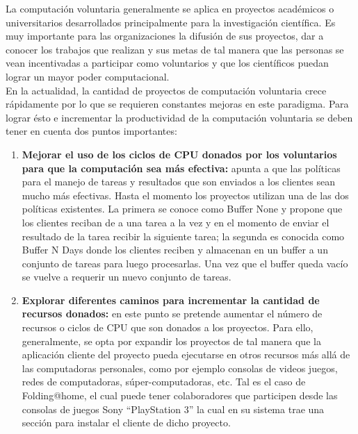 La computación voluntaria generalmente se aplica en proyectos académicos o universitarios desarrollados principalmente para la investigación científica. 
Es muy importante para las organizaciones la difusión de sus proyectos, dar a conocer los trabajos que realizan y sus metas de tal manera que las personas se vean incentivadas a participar  como voluntarios y que los científicos puedan lograr un mayor poder computacional.\\

En la actualidad, la cantidad de proyectos de computación voluntaria crece rápidamente por lo que se requieren constantes mejoras en este paradigma.
Para lograr ésto e incrementar la productividad de la computación voluntaria se deben tener en cuenta dos puntos importantes:\\

\begin{enumerate}
 \item \textbf{Mejorar el uso de los ciclos de CPU donados por los voluntarios para que la computación sea más efectiva:}
  apunta a que las políticas para el manejo de tareas y resultados que son enviados a los clientes sean mucho más efectivas.
  Hasta el momento los proyectos utilizan una de las dos políticas existentes.
  La primera se conoce como Buffer None y propone que los clientes reciban de a una tarea a la vez y en el momento de enviar el resultado de la tarea recibir la siguiente tarea; 
  la segunda es conocida como Buffer N Days donde los clientes reciben y almacenan en un buffer a un conjunto de tareas para luego procesarlas. 
  Una vez que el buffer queda vacío se vuelve a requerir un nuevo conjunto de tareas.\\

  \item \textbf{Explorar diferentes caminos para incrementar la cantidad de recursos donados:} 
en este punto se pretende aumentar el número de recursos o ciclos de CPU que son donados a los proyectos. 
Para ello, generalmente, se opta por expandir los proyectos de tal manera que la aplicación cliente del proyecto pueda ejecutarse
 en otros recursos más allá de las computadoras personales, como por ejemplo consolas de videos juegos, redes de computadoras, súper-computadoras, etc.
 Tal es el caso de Folding@home, el cual puede tener colaboradores que participen desde las consolas de juegos Sony “PlayStation 3” la cual en su sistema 
trae una sección para instalar el cliente de dicho proyecto.\\

\end{enumerate}

